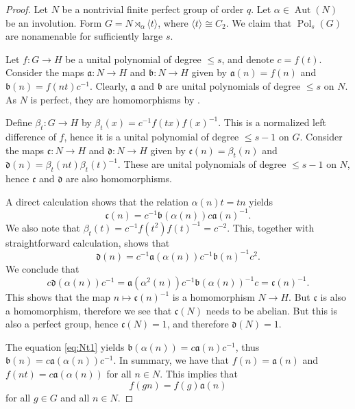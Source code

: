 \documentclass[a4paper,12pt]{amsart}
\theoremstyle{plain}
\theoremstyle{definition}
\theoremstyle{remark}
\numberwithin{equation}{subsection}
\DeclareMathOperator{\Aut}{Aut}
\DeclareMathOperator{\Pold}{Pol}
\begin{document}
\begin{proof}
    Let $N$ be a nontrivial finite perfect group of order $q$. Let $\alpha\in\Aut(N)$ be an involution. Form $G=N\rtimes_\alpha \langle t\rangle$, where $\langle t\rangle\cong C_2$. We claim that $\Pold_s(G)$ are nonamenable for sufficiently large $s$.

    Let $f:G\to H$ be a unital polynomial of degree $\le s$, and denote $c=f(t)$. Consider the maps $\mathfrak{a}:N\to H$ and $\mathfrak{b}:N\to H$ given by
    $\mathfrak{a}(n)=f(n)$ and $\mathfrak{b}(n)=f(nt)c^{-1}$. Clearly, $\mathfrak{a}$ and $\mathfrak{b}$ are unital polynomials of degree $\le s$ on $N$. As $N$ is perfect, they are homomorphisms by \cite[]{JT24}.

    Define $\beta_t:G\to H$ by $\beta_t(x)=c^{-1}f(tx)f(x)^{-1}$. This is a normalized left difference of $f$, hence it is a unital polynomial of degree $\le s-1$ on $G$. Consider the maps $\mathfrak{c}:N\to H$ and $\mathfrak{d}:N\to H$ given by $\mathfrak{c}(n)=\beta_t(n)$ and $\mathfrak{d}(n)=\beta_t(nt)\beta_t(t)^{-1}$. These are unital polynomials of degree $\le s-1$ on $N$, hence $\mathfrak{c}$ and $\mathfrak{d}$ are also homomorphisms.
    
    A direct calculation shows that the relation $\alpha(n)t=tn$ yields
    \begin{equation}
        \label{eq:Nt1}
        \mathfrak{c}(n)=c^{-1}\mathfrak{b}(\alpha(n))c\mathfrak{a}(n)^{-1}.
    \end{equation}
    We also note that $\beta_t(t)=c^{-1}f(t^2)f(t)^{-1}=c^{-2}$. This, together with straightforward calculation, shows that
    \begin{equation}
        \label{eq:Nt2}
        \mathfrak{d}(n)=c^{-1}\mathfrak{a}(\alpha(n))c^{-1}\mathfrak{b}(n)^{-1}c^2.
    \end{equation}
    We conclude that
    $$c\mathfrak{d}(\alpha(n))c^{-1}=\mathfrak{a}(\alpha^2(n))c^{-1}\mathfrak{b}(\alpha(n))^{-1}c=\mathfrak{c}(n)^{-1}.$$
    This shows that the map $n\mapsto\mathfrak{c}(n)^{-1}$ is a homomorphism $N\to H$. But $\mathfrak{c}$ is also a homomorphism, therefore we see that $\mathfrak{c}(N)$ needs to be abelian. But this is also a perfect group, hence $\mathfrak{c}(N)=1$, and therefore $\mathfrak{d}(N)=1$.

    The equation \eqref{eq:Nt1} yields $\mathfrak{b}(\alpha(n))=c\mathfrak{a}(n)c^{-1}$, thus $\mathfrak{b}(n)=c\mathfrak{a}(\alpha(n))c^{-1}$. In summary, we have that $f(n)=\mathfrak{a}(n)$ and $f(nt)=c\mathfrak{a}(\alpha(n))$ for all $n\in N$. This implies that 
    \begin{equation}
        \label{eq:Nt3}
        f(gn)=f(g)\mathfrak{a}(n)
    \end{equation}
    for all $g\in G$ and all $n\in N$.


\end{proof}
\end{document}
